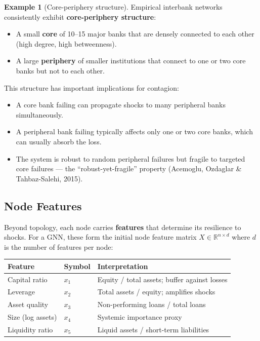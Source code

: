 \documentclass[11pt, a4paper]{article}
\theoremstyle{definition}
\newtheorem{example}{Example}[section]
\theoremstyle{plain}
\theoremstyle{remark}
\newcommand{\RV}{\mathbb{R}}
\begin{document}
\begin{example}[Core-periphery structure]\label{ex:core-periphery}
Empirical interbank networks consistently exhibit \textbf{core-periphery structure}:

\begin{itemize}
    \item A small \textbf{core} of 10--15 major banks that are densely connected
          to each other (high degree, high betweenness).
    \item A large \textbf{periphery} of smaller institutions that connect to one or
          two core banks but not to each other.
\end{itemize}

This structure has important implications for contagion:
\begin{itemize}
    \item A core bank failing can propagate shocks to many peripheral banks
          simultaneously.
    \item A peripheral bank failing typically affects only one or two core banks,
          which can usually absorb the loss.
    \item The system is robust to random peripheral failures but fragile to
          targeted core failures --- the ``robust-yet-fragile'' property
          (Acemoglu, Ozdaglar \& Tahbaz-Salehi, 2015).
\end{itemize}
\end{example}

\subsection{Node Features}

Beyond topology, each node carries \textbf{features} that determine its resilience
to shocks.
For a GNN, these form the initial node feature matrix $X \in \RV^{n \times d}$
where $d$ is the number of features per node:

\begin{center}
\begin{tabular}{@{}lll@{}}
\toprule
\textbf{Feature} & \textbf{Symbol} & \textbf{Interpretation} \\
\midrule
Capital ratio       & $x_1$ & Equity / total assets; buffer against losses \\
Leverage            & $x_2$ & Total assets / equity; amplifies shocks \\
Asset quality       & $x_3$ & Non-performing loans / total loans \\
Size (log assets)   & $x_4$ & Systemic importance proxy \\
Liquidity ratio     & $x_5$ & Liquid assets / short-term liabilities \\
\bottomrule
\end{tabular}
\end{center}
\end{document}
